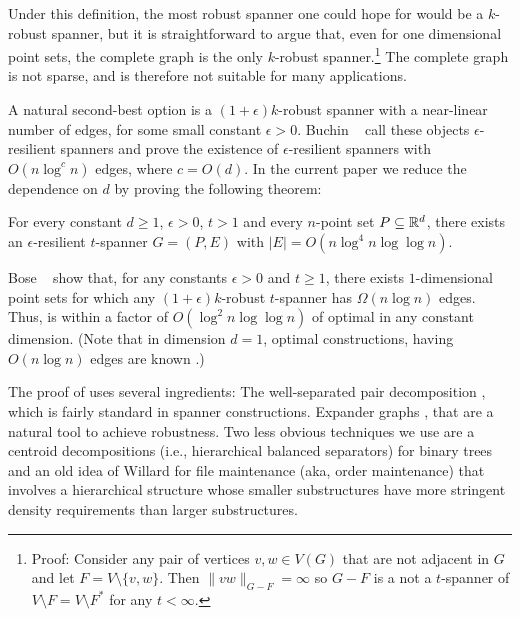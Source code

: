 \documentclass{patmorin}
\begin{document}
Under this definition, the most robust spanner one could hope for
would be a $k$-robust spanner, but it is straightforward to argue
that, even for one dimensional point sets, the complete graph is the
only $k$-robust spanner.\footnote{Proof: Consider any pair of vertices
$v,w\in V(G)$ that are not adjacent in $G$ and let $F=V\setminus\{v,w\}$.
Then $\|vw\|_{G-F}=\infty$ so $G-F$ is a not a $t$-spanner of $V\setminus
F=V\setminus F^*$ for any $t<\infty$.} The complete graph is not sparse,
and is therefore not suitable for many applications.

A natural second-best option is a $(1+\epsilon)k$-robust spanner with
a near-linear number of edges, for some small constant $\epsilon
>0$.  Buchin \etal\ \cite{buchin.har-peled.ea:spanner} call these
objects $\epsilon$-resilient spanners and prove the existence of
$\epsilon$-resilient spanners with $O(n\log^c n)$ edges, where $c=O(d)$.
In the current paper we reduce the dependence on $d$ by proving the
following theorem:

\begin{thm}
  For every constant $d\ge 1$, $\epsilon>0$, $t>1$ and every $n$-point
  set $P\subseteq\mathbb{R}^d$, there exists an $\epsilon$-resilient $t$-spanner
  $G=(P,E)$ with $|E|=O(n\log^4 n\log\log n)$.
\end{thm}

Bose \etal\ \cite{bose.dujmovic.ea:robust} show that, for any constants
$\epsilon>0$ and $t\ge 1$, there exists $1$-dimensional point sets
for which any $(1+\epsilon)k$-robust $t$-spanner has $\Omega(n\log
n)$ edges.  Thus,  is within a factor of $O(\log^2
n\log\log n)$ of optimal in any constant dimension.  (Note that in
dimension $d=1$, optimal constructions, having $O(n\log n)$ edges are known
\cite{buchin.har-peled.ea:spanner}.)

The proof of  uses several ingredients: The well-separated
pair decomposition \cite{callahan.kosaraju:decomposition}, which
is fairly standard in spanner constructions.  Expander graphs
\cite{hoory.linial.ea:expanders}, that are a natural tool to
achieve robustness. Two less obvious techniques we use are a centroid
decompositions (i.e., hierarchical balanced separators) for binary trees
and an old idea of Willard \cite{willard:maintaining} for file maintenance
(aka, order maintenance) that involves a hierarchical structure whose
smaller substructures have more stringent density requirements than
larger substructures.
\end{document}
